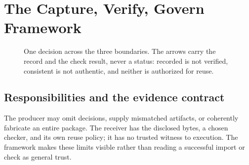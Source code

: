 \documentclass[conference]{IEEEtran}
\begin{document}
\section{The Capture, Verify, Govern Framework}
\begin{figure}[t]
\centering\scriptsize
{}
\caption{One decision across the three boundaries. The arrows carry the record and the check result, never a status: recorded is not verified, consistent is not authentic, and neither is authorized for reuse.}
\label{fig:boundaries}
\end{figure}
\subsection{Responsibilities and the evidence contract}
The producer may omit decisions, supply mismatched artifacts, or coherently fabricate an entire package. The receiver has the disclosed bytes, a chosen checker, and its own reuse policy; it has no trusted witness to execution. The framework makes these limits visible rather than reading a successful import or check as general trust.
\end{document}
